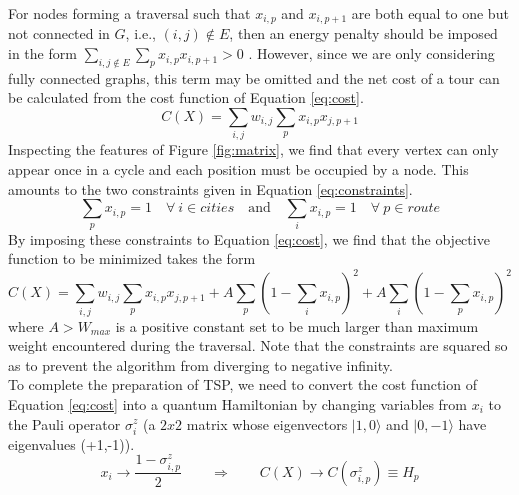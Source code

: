 For nodes forming a traversal such that $x_{i,p}$ and $x_{i,p+1}$ are both equal to one but not connected in $G$, i.e., $(i,j)\notin E$, then an energy penalty should be imposed in the form $\sum_{i,j \notin E}\sum_p x_{i,p}x_{i,p+1}>0$ \cite{lucas2014ising}.
However, since we are only considering fully connected graphs, this term may be omitted and the net cost of a tour can be calculated from the cost function of Equation \ref{eq:cost}.
\begin{equation}
	C(X)=\sum_{i,j}w_{i,j} \sum_p x_{i,p}x_{j,p+1} 
	\label{eq:cost}
\end{equation}
Inspecting the features of Figure \ref{fig:matrix}, we find that every vertex can only appear once in a cycle and each position must be occupied by a node. 
This amounts to the two constraints given in Equation \ref{eq:constraints}.
\begin{equation}
	\sum_p x_{i,p}=1 \quad \forall \: i \in cities \quad \text{and} \quad \sum_i x_{i,p}=1 \quad \forall \: p \in route
	\label{eq:constraints}
\end{equation}
By imposing these constraints to Equation \ref{eq:cost}, we find that the objective function to be minimized takes the form
\begin{equation}
	C(X)=\sum_{i,j}w_{i,j} \sum_p x_{i,p}x_{j,p+1} + A\sum_p (1 - \sum_i x_{i,p})^2 + A\sum_i (1 - \sum_p x_{i,p})^2
	\label{eq:hamiltoniancircuit}
\end{equation}
where $A>W_{max}$ is a positive constant set to be much larger than maximum weight encountered during the traversal. Note that the constraints are squared so as to prevent the algorithm from diverging to negative infinity. \\

To complete the preparation of TSP, we need to convert the cost function of Equation \ref{eq:cost} into a quantum Hamiltonian by changing variables from $x_i$ to the Pauli operator $\sigma_i^z$ (a $2x2$ matrix whose eigenvectors $|1,0\rangle$ and $|0,-1\rangle$ have eigenvalues (+1,-1)). 
\begin{equation}
	x_i \rightarrow \frac{ 1-\sigma_{i,p}^z}{2} \qquad \Rightarrow \qquad C(X) \rightarrow C(\sigma_{i,p}^z) \equiv H_p
	\label{eq:transformation}
\end{equation}